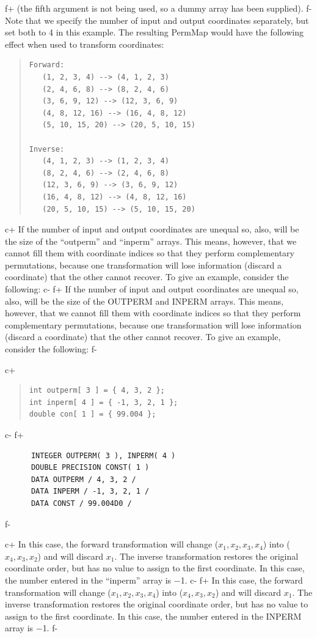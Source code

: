 \documentclass[twoside,11pt]{article}
\begin{document}
f+
(the fifth argument is not being used, so a dummy array has been supplied).
f-
Note that we specify the number of input and output coordinates
separately, but set both to 4 in this example. The resulting PermMap
would have the following effect when used to transform coordinates:

\begin{quote}
\begin{verbatim}
Forward:
   (1, 2, 3, 4) --> (4, 1, 2, 3)
   (2, 4, 6, 8) --> (8, 2, 4, 6)
   (3, 6, 9, 12) --> (12, 3, 6, 9)
   (4, 8, 12, 16) --> (16, 4, 8, 12)
   (5, 10, 15, 20) --> (20, 5, 10, 15)

Inverse:
   (4, 1, 2, 3) --> (1, 2, 3, 4)
   (8, 2, 4, 6) --> (2, 4, 6, 8)
   (12, 3, 6, 9) --> (3, 6, 9, 12)
   (16, 4, 8, 12) --> (4, 8, 12, 16)
   (20, 5, 10, 15) --> (5, 10, 15, 20)
\end{verbatim}
\end{quote}

c+
If the number of input and output coordinates are unequal so, also,
will be the size of the ``outperm'' and ``inperm'' arrays. This means,
however, that we cannot fill them with coordinate indices so that they
perform complementary permutations, because one transformation will
lose information (discard a coordinate) that the other cannot recover.
To give an example, consider the following:
c-
f+
If the number of input and output coordinates are unequal so, also,
will be the size of the OUTPERM and INPERM arrays. This means,
however, that we cannot fill them with coordinate indices so that they
perform complementary permutations, because one transformation will
lose information (discard a coordinate) that the other cannot recover.
To give an example, consider the following:
f-

c+
\begin{quote}
\small
\begin{verbatim}
int outperm[ 3 ] = { 4, 3, 2 };
int inperm[ 4 ] = { -1, 3, 2, 1 };
double con[ 1 ] = { 99.004 };
\end{verbatim}
\normalsize
\end{quote}
c-
f+
\small
\begin{verbatim}
      INTEGER OUTPERM( 3 ), INPERM( 4 )
      DOUBLE PRECISION CONST( 1 )
      DATA OUTPERM / 4, 3, 2 /
      DATA INPERM / -1, 3, 2, 1 /
      DATA CONST / 99.004D0 /
\end{verbatim}
\normalsize
f-

c+
In this case, the forward transformation will change
($x_1,x_2,x_3,x_4$) into ($x_4,x_3,x_2$) and will discard $x_1$. The
inverse transformation restores the original coordinate order, but has
no value to assign to the first coordinate. In this case, the number
entered in the ``inperm'' array is $-$1.
c-
f+
In this case, the forward transformation will change
($x_1,x_2,x_3,x_4$) into ($x_4,x_3,x_2$) and will discard $x_1$. The
inverse transformation restores the original coordinate order, but has
no value to assign to the first coordinate. In this case, the number
entered in the INPERM array is $-$1.
f-
\end{document}
